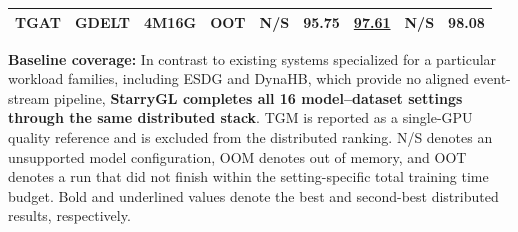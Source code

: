 \begin{table}[b]
\begin{tabular}{lll|c|ccccc}
TGAT & GDELT & 4M16G & OOT & N/S & 95.75 & \underline{97.61} & N/S & \textbf{98.08} \\
\bottomrule
\end{tabular}
\vspace{2pt}
\begin{minipage}{\linewidth}
\scriptsize
\noindent
\impstar \textbf{Baseline coverage:}
In contrast to existing systems specialized for a particular workload
families, including ESDG and DynaHB, which provide no aligned
event-stream pipeline, \textbf{StarryGL completes all 16
model--dataset settings through the same distributed stack}.
TGM is reported as a single-GPU quality reference and is excluded
from the distributed ranking. N/S denotes an unsupported model
configuration, OOM denotes out of memory, and OOT denotes a run that
did not finish within the setting-specific total training time budget.
Bold and underlined values denote the best and
second-best distributed results, respectively.
\end{minipage}
\vspace{-5pt}
\end{table}

